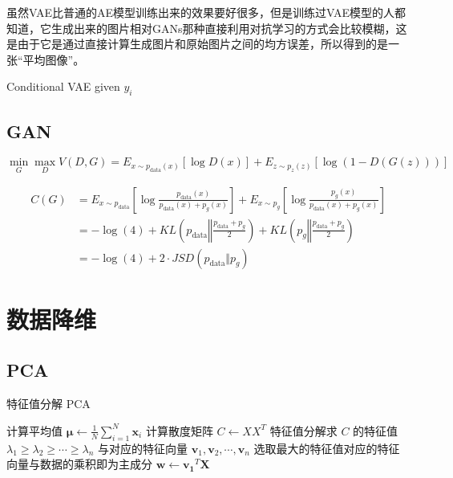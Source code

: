 虽然VAE比普通的AE模型训练出来的效果要好很多，但是训练过VAE模型的人都知道，它生成出来的图片相对GANs那种直接利用对抗学习的方式会比较模糊，这是由于它是通过直接计算生成图片和原始图片之间的均方误差，所以得到的是一张“平均图像”。

Conditional VAE given $y_i$

\subsection{GAN}

\begin{equation}
	\min_G\max_D V(D,G) = E_{x\sim p_\text{data}(x)}[\log D(x)] + E_{z\sim p_z(z)}[\log(1-D(G(z)))]
\end{equation}

\begin{align*}
	C(G) &= E_{x\sim p_\text{data}}\left[\log\frac{p_\text{data}(x)}{p_\text{data}(x)+p_g(x)}\right]+E_{x\sim p_g}\left[\log\frac{p_g(x)}{p_\text{data}(x)+p_g(x)}\right] \\
	&=-\log(4)+KL\left(p_\text{data}\left\Vert\frac{p_\text{data}+p_g}{2}\right.\right)+KL\left(p_g\left\Vert\frac{p_\text{data}+p_g}{2}\right.\right)\\
	&=-\log(4)+2\cdot JSD(p_\text{data}\Vert p_g)
\end{align*}


\section{数据降维}

\subsection{PCA}

    \begin{algorithm}
	\caption{特征值分解 PCA}
	\BlankLine
	计算平均值 $\mathbf{\mu}\leftarrow\frac{1}{N}\sum_{i=1}^N \mathbf{x}_i$\;
	计算散度矩阵 $C\leftarrow XX^T$\;
	特征值分解求 $C$ 的特征值 $\lambda_1\geq\lambda_2\geq\cdots\geq\lambda_n$ 与对应的特征向量 $\mathbf{v}_1,\mathbf{v}_2,\cdots,\mathbf{v}_n$\;
	选取最大的特征值对应的特征向量与数据的乘积即为主成分 $\mathbf{w}\leftarrow\mathbf{v_1}^T\mathbf{X}$\;
	\;
\end{algorithm}

